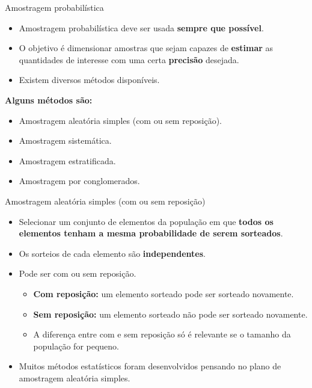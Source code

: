 \documentclass[
  ignorenonframetext,
  serif,
  professionalfont,
  usenames,
  dvipsnames,
  aspectratio = 169]{beamer}
\providecommand{\tightlist}{%
  \setlength{\itemsep}{0pt}\setlength{\parskip}{0pt}}
\renewcommand{\tightlist}{%
  \setlength{\itemsep}{0\baselineskip}
  \setlength{\parskip}{0.25\baselineskip}
}
\def\beginAHalfColumn{\begin{minipage}{0.49\textwidth}}%
\def\endColumns{\end{minipage}}%
\begin{document}
\begin{frame}{Amostragem probabilística}
\protect\hypertarget{amostragem-probabiluxedstica-1}{}
\beginAHalfColumn

\begin{itemize}
\item
  Amostragem probabilística deve ser usada \textbf{sempre que possível}.
\item
  O objetivo é dimensionar amostras que sejam capazes de
  \textbf{estimar} as quantidades de interesse com uma certa
  \textbf{precisão} desejada.
\item
  Existem diversos métodos disponíveis.
\end{itemize}

\endColumns
\beginAHalfColumn

\textbf{Alguns métodos são:}

\begin{itemize}
\tightlist
\item
  Amostragem aleatória simples (com ou sem reposição).
\item
  Amostragem sistemática.
\item
  Amostragem estratificada.
\item
  Amostragem por conglomerados.
\end{itemize}

\endColumns
\end{frame}

\begin{frame}{Amostragem aleatória simples (com ou sem reposição)}
\protect\hypertarget{amostragem-aleatuxf3ria-simples-com-ou-sem-reposiuxe7uxe3o}{}
\begin{itemize}
\item
  Selecionar um conjunto de elementos da população em que
  \textbf{todos os elementos tenham a mesma probabilidade de serem sorteados}.
\item
  Os sorteios de cada elemento são \textbf{independentes}.
\item
  Pode ser com ou sem reposição.

  \begin{itemize}
  \item
    \textbf{Com reposição:} um elemento sorteado pode ser sorteado
    novamente.
  \item
    \textbf{Sem reposição:} um elemento sorteado não pode ser sorteado
    novamente.
  \item
    A diferença entre com e sem reposição só é relevante se o tamanho da
    população for pequeno.
  \end{itemize}
\item
  Muitos métodos estatísticos foram desenvolvidos pensando no plano de
  amostragem aleatória simples.
\end{itemize}
\end{frame}
\end{document}
